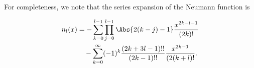 For completeness, we note that the series expansion of the Neumann function is

\begin{equation}\label{eqn:qmTwoL23:920b}
\begin{aligned}
n_l(x)
&= 
-\sum_{k=0}^{l-1} 
\prod_{j=0}^{l-1}  \Abs{ 2(k-j)-1} \frac{x^{2 k -l -1}}{(2k)!} \\
&\quad -
\sum_{k=0}^\infty (-1)^k \frac{(2 k + 3 l - 1)!!}{(2k - 1)!!}
\frac{x^{2k-1}}{(2(k + l)!}.
\end{aligned}
\end{equation}

\EndArticle
